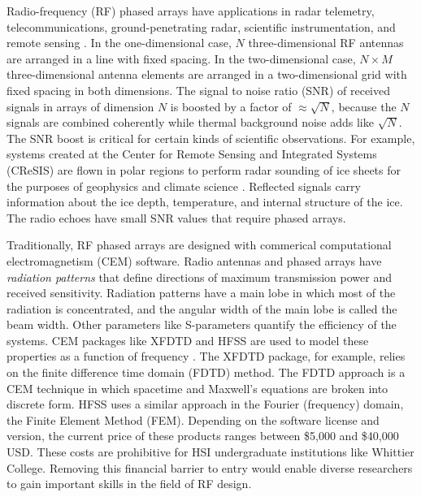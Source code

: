 \documentclass[../../main.tex]{subfiles}
\begin{document}
Radio-frequency (RF) phased arrays have applications in radar telemetry, telecommunications, ground-penetrating radar, scientific instrumentation, and remote sensing \cite{Vieregg_2016,AVVA201746,arnold_2020,PhysRevD.105.122006,10.3390/s21186091,10.1016/j.jappgeo.2022.104876,phased_array_book}.  In the one-dimensional case, $N$ three-dimensional RF antennas are arranged in a line with fixed spacing.  In the two-dimensional case, $N \times M$ three-dimensional antenna elements are arranged in a two-dimensional grid with fixed spacing in both dimensions.  The signal to noise ratio (SNR) of received signals in arrays of dimension $N$ is boosted by a factor of $\approx \sqrt{N}$, because the $N$ signals are combined coherently while thermal background noise adds like $\sqrt{N}$.  The SNR boost is critical for certain kinds of scientific observations.  For example, systems created at the Center for Remote Sensing and Integrated Systems (CReSIS) are flown in polar regions to perform radar sounding of ice sheets for the purposes of geophysics and climate science \cite{arnold_2020}.  Reflected signals carry information about the ice depth, temperature, and internal structure of the ice.  The radio echoes have small SNR values that require phased arrays.  \\ \vspace{2.5mm}

Traditionally, RF phased arrays are designed with commerical computational electromagnetism (CEM) software.  Radio antennas and phased arrays have \textit{radiation patterns} that define directions of maximum transmission power and received sensitivity.  Radiation patterns have a main lobe in which most of the radiation is concentrated, and the angular width of the main lobe is called the beam width.  Other parameters like S-parameters quantify the efficiency of the systems.  CEM packages like XFDTD and HFSS are used to model these properties as a function of frequency \cite{remcom,ansys}.  The XFDTD package, for example, relies on the finite difference time domain (FDTD) method. The FDTD approach is a CEM technique in which spacetime and Maxwell’s equations are broken into discrete form.  HFSS uses a similar approach in the Fourier (frequency) domain, the Finite Element Method (FEM).  Depending on the software license and version, the current price of these products ranges between \$5,000 and \$40,000 USD.  These costs are prohibitive for HSI undergraduate institutions like Whittier College.  Removing this financial barrier to entry would enable diverse researchers to gain important skills in the field of RF design. \\ \vspace{2.5mm}
\end{document}
